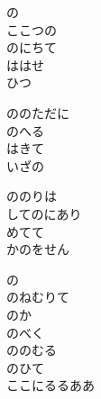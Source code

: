 \documentclass[10pt,b5j]{tarticle} %
\begin{document}
\vspace{1.5em} %
\newcommand{\linespace}{0.5em} %
\newcommand{\blocksize}{0.5\hsize} %
\begin{enumerate} %
    \begin{minipage}[c]{\blocksize}
    
        \vspace{\linespace}
        \item
        の\\
        ここつの\\
        のにちて\\
        ははせ\\
        ひつ
        
        \vspace{\linespace}
        \item
        ののただに\\
        のへる\\
        はきて\\
        いざの
        
        \vspace{\linespace}
        \item
        ののりは\\
        してのにあり\\
        めてて\\
        かのをせん
        
        \vspace{\linespace}
        \item
        の\\
        のねむりて\\
        のか\\
        のべく\\
        ののむる\\
        のひて\\
        ここにるるああ
        

\end{minipage}
\end{enumerate}
\end{document}
